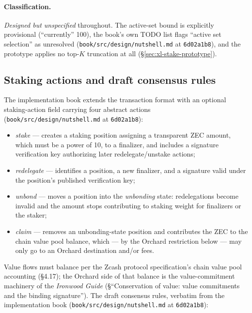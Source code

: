 \documentclass[11pt,a4paper]{article}
\theoremstyle{definition}
\begin{document}
\paragraph{Classification.} \emph{Designed but unspecified} throughout.
The active-set bound is explicitly provisional (``currently'' 100), the
book's own TODO list flags ``active set selection'' as unresolved
(\texttt{book/src/design/nutshell.md} at \texttt{6d02a1b8}), and the
prototype applies no top-$K$ truncation at all
(\S\ref{sec:xl-stake-prototype}).

\subsection{Staking actions and draft consensus rules}
\label{sec:xl-stake-actions}

The implementation book extends the transaction format with an optional
staking-action field carrying four abstract actions
(\texttt{book/src/design/nutshell.md} at \texttt{6d02a1b8}):

\begin{itemize}
\item \emph{stake} --- creates a staking position assigning a transparent
  ZEC amount, which must be a power of 10, to a finalizer, and includes a
  signature verification key authorizing later redelegate/unstake actions;
\item \emph{redelegate} --- identifies a position, a new finalizer, and a
  signature valid under the position's published verification key;
\item \emph{unbond} --- moves a position into the \emph{unbonding} state:
  redelegations become invalid and the amount stops contributing to
  staking weight for finalizers or the staker;
\item \emph{claim} --- removes an unbonding-state position and contributes
  the ZEC to the chain value pool balance, which --- by the Orchard
  restriction below --- may only go to an Orchard destination and/or fees.
\end{itemize}

Value flows must balance per the Zcash protocol specification's chain
value pool accounting (\S4.17); the Orchard side of that balance is the
value-commitment machinery of the \emph{Ironwood Guide} (\S``Conservation
of value: value commitments and the binding signature''). The draft
consensus rules, verbatim from the implementation book
(\texttt{book/src/design/nutshell.md} at \texttt{6d02a1b8}):
\end{document}
